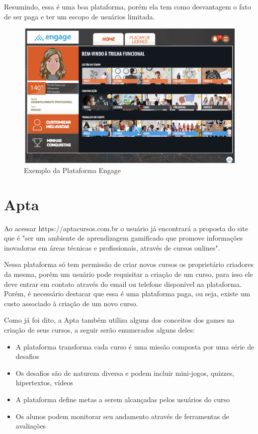 Resumindo, essa é uma boa plataforma, porém ela tem como desvantagem o fato de ser paga e ter um escopo de usuários limitada.

\begin{figure}[htp]
\begin{center}
  \includegraphics[width=15cm]{images/trabalhos-relacionados-img/img1-Engage.png}
  \caption{Exemplo da Plataforma Engage}
  \label{fig:exampleEngage}
\end{center}
\end{figure}


\section{Apta}

Ao acessar https://aptacursos.com.br  o usuário já encontrará a proposta do site que é "ser um ambiente de aprendizagem gamificado que promove informações inovadoras em áreas técnicas e profissionais, através de cursos onlines".

Nessa plataforma só tem permissão de criar novos cursos os proprietário criadores da mesma, porém um usuário pode requisitar a criação de um curso, para isso ele deve entrar em contato através do email ou telefone disponível na plataforma. Porém, é necessário destacar que essa é uma plataforma paga, ou seja, existe um custo associado à criação de um novo curso.

Como já foi dito, a Apta também utiliza alguns dos conceitos dos games na criação de seus cursos, a seguir serão enumerados alguns deles:

\begin{itemize}
\item A plataforma transforma cada curso é uma missão composta por uma série de desafios
\item Os desafios são de natureza diversa e podem incluir mini-jogos, quizzes, hipertextos, vídeos
\item A plataforma define metas a serem alcançadas pelos usuários do curso
\item Os alunos podem monitorar seu andamento através de ferramentas de avaliações
\end{itemize}

